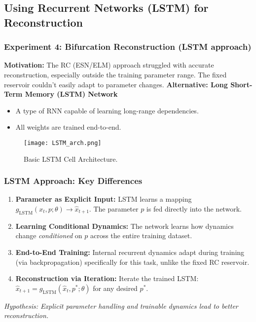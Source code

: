 \documentclass{beamer}
\begin{document}
\subsection{Using Recurrent Networks (LSTM) for Reconstruction}

\begin{frame}
    \frametitle{Experiment 4: Bifurcation Reconstruction (LSTM approach)}
    \textbf{Motivation:} The RC (ESN/ELM) approach struggled with accurate reconstruction, especially outside the training parameter range. The fixed reservoir couldn't easily adapt to parameter changes.
    \vspace{1em}
    \textbf{Alternative: Long Short-Term Memory (LSTM) Network}
    \begin{itemize}
        \item A type of RNN capable of learning long-range dependencies.
        \item All weights are trained end-to-end.
    \end{itemize}
    \begin{figure}
        \centering
        \texttt{[image: LSTM\_arch.png]}
        \caption{Basic LSTM Cell Architecture.}
        \label{fig:lstm_arch_slide}
    \end{figure}
\end{frame}

\begin{frame}
    \frametitle{LSTM Approach: Key Differences}
    \begin{enumerate}
        \item \textbf{Parameter as Explicit Input:} LSTM learns a mapping $g_{\text{LSTM}}(x_t, p; \theta) \rightarrow \hat{x}_{t+1}$. The parameter $p$ is fed directly into the network.
        \pause
        \item \textbf{Learning Conditional Dynamics:} The network learns how dynamics change \textit{conditioned} on $p$ across the entire training dataset.
        \pause
        \item \textbf{End-to-End Training:} Internal recurrent dynamics adapt during training (via backpropagation) specifically for this task, unlike the fixed RC reservoir.
        \pause
        \item \textbf{Reconstruction via Iteration:} Iterate the trained LSTM: $\hat{x}_{t+1} = g_{\text{LSTM}}(\hat{x}_t, p^*; \theta)$ for any desired $p^*$.
    \end{enumerate}
    \vspace{1em}
    \textit{Hypothesis: Explicit parameter handling and trainable dynamics lead to better reconstruction.}
\end{frame}
\end{document}
